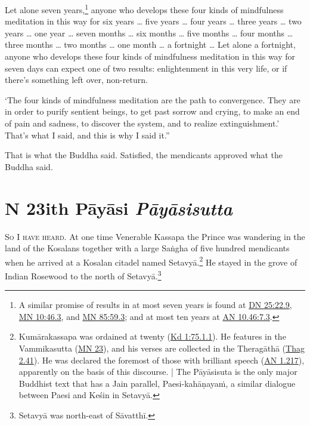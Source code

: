 \documentclass[12pt,openany]{book}%
\newcommand*{\suttatitleacronym}[1]{\smaller[2]{#1}\vspace*{.3em}}
\newcommand*{\suttatitletranslation}[1]{\linebreak{#1}}
\newcommand*{\suttatitleroot}[1]{\linebreak\smaller[2]\itshape{#1}}
\newcommand*{\tocacronym}[1]{\hspace*{-3.3em}{#1}\quad}
\newcommand*{\toctranslation}[1]{#1}
\newcommand*{\tocroot}[1]{(\textit{#1})}
\newcommand*{\scevam}[1]{\textsc{#1}}
\renewcommand*{\tocacronym}[1]{\hspace*{0em}{#1}\quad}%
\begin{document}
Let alone seven years,\footnote{A similar promise of results in at most seven years is found at \href{https://suttacentral.net/dn25/en/sujato\#22.9}{DN 25:22.9}, \href{https://suttacentral.net/mn10/en/sujato\#46.3}{MN 10:46.3}, and \href{https://suttacentral.net/mn85/en/sujato\#59.3}{MN 85:59.3}; and at most ten years at \href{https://suttacentral.net/an10.46/en/sujato\#7.3}{AN 10.46:7.3}. } anyone who develops these four kinds of mindfulness meditation in this way for six years … five years … four years … three years … two years … one year … seven months … six months … five months … four months … three months … two months … one month … a fortnight … Let alone a fortnight, anyone who develops these four kinds of mindfulness meditation in this way for seven days can expect one of two results: enlightenment in this very life, or if there’s something left over, non-return. 

‘The four kinds of mindfulness meditation are the path to convergence. They are in order to purify sentient beings, to get past sorrow and crying, to make an end of pain and sadness, to discover the system, and to realize extinguishment.’ That’s what I said, and this is why I said it.” 

That is what the Buddha said. Satisfied, the mendicants approved what the Buddha said. 

%
\chapter*{{\suttatitleacronym DN 23}{\suttatitletranslation With Pāyāsi }{\suttatitleroot Pāyāsisutta}}
\addcontentsline{toc}{chapter}{\tocacronym{DN 23} \toctranslation{With Pāyāsi } \tocroot{Pāyāsisutta}}

\scevam{So I have heard. }At one time Venerable Kassapa the Prince was wandering in the land of the Kosalans together with a large \textsanskrit{Saṅgha} of five hundred mendicants when he arrived at a Kosalan citadel named \textsanskrit{Setavyā}.\footnote{\textsanskrit{Kumārakassapa} was ordained at twenty (\href{https://suttacentral.net/pli-tv-kd1/en/sujato\#75.1.1}{Kd 1:75.1.1}). He features in the Vammikasutta (\href{https://suttacentral.net/mn23/en/sujato}{MN 23}), and his verses are collected in the \textsanskrit{Theragāthā} (\href{https://suttacentral.net/thag2.41/en/sujato}{Thag 2.41}). He was declared the foremost of those with brilliant speech (\href{https://suttacentral.net/an1.217/en/sujato}{AN 1.217}), apparently on the basis of this discourse. | The \textsanskrit{Pāyāsisuta} is the only major Buddhist text that has a Jain parallel, Paesi-\textsanskrit{kahāṇayaṁ}, a similar dialogue between Paesi and \textsanskrit{Keśin} in \textsanskrit{Setavyā}. } He stayed in the grove of Indian Rosewood to the north of \textsanskrit{Setavyā}.\footnote{\textsanskrit{Setavyā} was north-east of \textsanskrit{Sāvatthī}. } 
\end{document}
